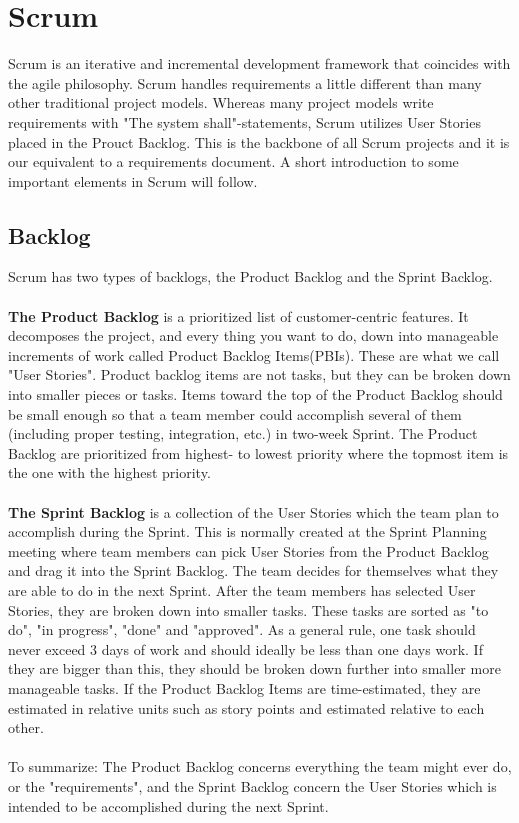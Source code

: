 \section{Scrum}
Scrum is an iterative and incremental development framework that coincides with the agile philosophy. Scrum handles requirements a little different than many other traditional project models. Whereas many project models write requirements with "The system shall"-statements, Scrum utilizes User Stories placed in the Prouct Backlog. This is the backbone of all Scrum projects and it is our equivalent to a requirements document. A short introduction to some important elements in Scrum will follow. 


\subsection{Backlog}
Scrum has two types of backlogs, the Product Backlog and the Sprint Backlog.
\\ \\ 
\textbf{The Product Backlog} is a prioritized list of customer-centric features. It decomposes the project, and every thing you want to do, down into manageable increments of work called Product Backlog Items(PBIs). These are what we call "User Stories". Product backlog items are not tasks, but they can be broken down into smaller pieces or tasks. Items toward the top of the Product Backlog should be small enough so that a team member could accomplish several of them (including proper testing, integration, etc.) in two-week Sprint. The Product Backlog are prioritized from highest- to lowest priority where the topmost item is the one with the highest priority.   
\\ \\ 
\textbf{The Sprint Backlog} is a collection of the User Stories which the team plan to accomplish during the Sprint. This is normally created at the Sprint Planning meeting where team members can pick User Stories from the Product Backlog and drag it into the Sprint Backlog. The team decides for themselves what they are able to do in the next Sprint. After the team members has selected User Stories, they are broken down into smaller tasks. These tasks are sorted as "to do", "in progress", "done" and "approved". As a general rule, one task should never exceed 3 days of work and should ideally be less than one days work. If they are bigger than this, they should be broken down further into smaller more manageable tasks. If the Product Backlog Items are time-estimated, they are estimated in relative units such as story points and estimated relative to each other.
\\ \\ 
To summarize: The Product Backlog concerns everything the team might ever do, or the "requirements", and the Sprint Backlog concern the User Stories which is intended to be accomplished during the next Sprint.  
 

